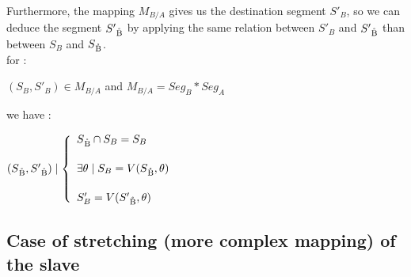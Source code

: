 \documentclass[a4paper]{article}
\begin{document}
Furthermore, the mapping $M_{B/A}$ gives us the destination segment $S'_B$, so we can deduce the segment $S'\textsubscript{\r{B}}$ by applying the same relation between $S'_B$ and $S'\textsubscript{\r{B}}$ than between $S_B$ and $S\textsubscript{\r{B}}$.
\\

for : \begin{center} $(S_B, S'_B) \in M_{B/A}$ and $M_{B/A} = Seg_B * Seg_A$ \end{center}

we have :

\begin{center}
$(S\textsubscript{\r{B}}, S'\textsubscript{\r{B}}) \mid \left\lbrace 
\begin{array}{lcl} 
S\textsubscript{\r{B}} \cap S_B = S_B\\ [0.5cm]
\exists \theta \mid S_B = V(S\textsubscript{\r{B}}, \theta)\\ [0.5cm]
S'_B = V(S'\textsubscript{\r{B}}, \theta)
\end{array}\right.$
\end{center}


\subsection{Case of stretching (more complex mapping) of the slave}\label{subsec:complexMap}





\end{document}
